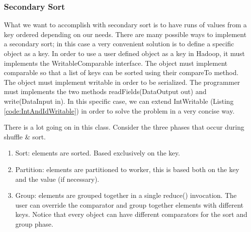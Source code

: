\documentclass[a4paper,12pt]{article}
\begin{document}
\subsubsection{Secondary Sort}

What we want to accomplish with secondary sort is to have runs of values from a key ordered depending on our needs.
There are many possible ways to implement a secondary sort; in this case a very convenient solution is to define a specific object as a key.
In order to use a user defined object as a key in Hadoop, it must implements the WritableComparable interface.
The object must implement comparable so that a list of keys can be sorted using their compareTo method. 
The object must implement writable in order to be serialized.
The programmer must implements the two methods readFields(DataOutput out) and write(DataInput in). 
In this specific case, we can extend IntWritable (Listing \ref{code:IntAndIdWritable}) in order to solve the problem in a very concise way.


There is a lot going on in this class. Consider the three phases that occur during shuffle \& sort.
\begin{enumerate}
\item Sort: elements are sorted. Based exclusively on the key.
\item Partition: elements are partitioned to worker, this is based both on the key and the value (if necessary).
\item Group: elements are grouped together in a single reduce() invocation. 
The user can override the comparator and group together elements with different keys. Notice that every object can have different comparators for the sort and group phase.
\end{enumerate}
\end{document}
